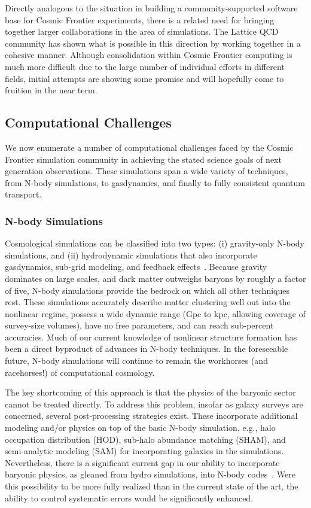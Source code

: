 Directly analogous to the situation in building a community-supported
software base for Cosmic Frontier experiments, there is a related need
for bringing together larger collaborations in the area of
simulations. The Lattice QCD community has shown what is possible in
this direction by working together in a cohesive manner. Although
consolidation within Cosmic Frontier computing is much more difficult
due to the large number of individual efforts in different fields,
initial attempts are showing some promise and will hopefully come to
fruition in the near term.

\subsection{Computational Challenges}

We now enumerate a number of computational challenges faced by the
Cosmic Frontier simulation community in achieving the stated science
goals of next generation observations. These simulations span a wide
variety of techniques, from N-body simulations, to gasdynamics, and
finally to fully consistent quantum transport.

\subsubsection{N-body Simulations}

Cosmological simulations can be classified into two types: (i)
gravity-only N-body simulations, and (ii) hydrodynamic simulations
that also incorporate gasdynamics, sub-grid modeling, and feedback
effects~\cite{dolag}. Because gravity dominates on large scales, and
dark matter outweighs baryons by roughly a factor of five, N-body
simulations provide the bedrock on which all other techniques
rest. These simulations accurately describe matter clustering well out
into the nonlinear regime, possess a wide dynamic range (Gpc to kpc,
allowing coverage of survey-size volumes), have no free parameters,
and can reach sub-percent accuracies. Much of our current knowledge of
nonlinear structure formation has been a direct byproduct of advances
in N-body techniques. In the foreseeable future, N-body simulations
will continue to remain the workhorses (and racehorses!) of
computational cosmology.

The key shortcoming of this approach is that the physics of the
baryonic sector cannot be treated directly. To address this problem,
insofar as galaxy surveys are concerned, several post-processing
strategies exist. These incorporate additional modeling and/or physics
on top of the basic N-body simulation, e.g., halo occupation
distribution (HOD), sub-halo abundance matching (SHAM), and
semi-analytic modeling (SAM) for incorporating galaxies in the
simulations. Nevertheless, there is a significant current gap in our
ability to incorporate baryonic physics, as gleaned from hydro
simulations, into N-body codes~\cite{motext}. Were this possibility to
be more fully realized than in the current state of the art, the
ability to control systematic errors would be significantly enhanced.

